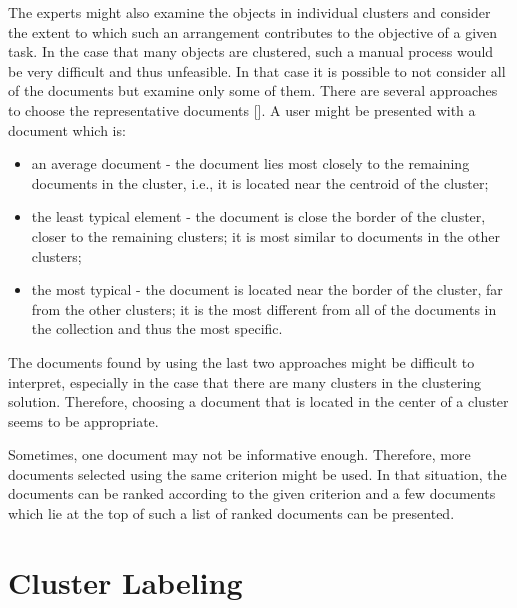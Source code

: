 The experts might also examine the objects in individual clusters and consider the extent to which such an arrangement contributes to the objective of a given task. In the case that many objects are clustered, such a manual process would\\[0pt]
be very difficult and thus unfeasible. In that case it is possible to not consider all of the documents but examine only some of them. There are several approaches to choose the representative documents [\cite{ref99}]. A user might be presented with a document which is:

\begin{itemize}
  \item an average document - the document lies most closely to the remaining documents in the cluster, i.e., it is located near the centroid of the cluster;
  \item the least typical element - the document is close the border of the cluster, closer to the remaining clusters; it is most similar to documents in the other clusters;
  \item the most typical - the document is located near the border of the cluster, far from the other clusters; it is the most different from all of the documents in the collection and thus the most specific.
\end{itemize}

The documents found by using the last two approaches might be difficult to interpret, especially in the case that there are many clusters in the clustering solution. Therefore, choosing a document that is located in the center of a cluster seems to be appropriate.

Sometimes, one document may not be informative enough. Therefore, more documents selected using the same criterion might be used. In that situation, the documents can be ranked according to the given criterion and a few documents which lie at the top of such a list of ranked documents can be presented.

\section{Cluster Labeling}

